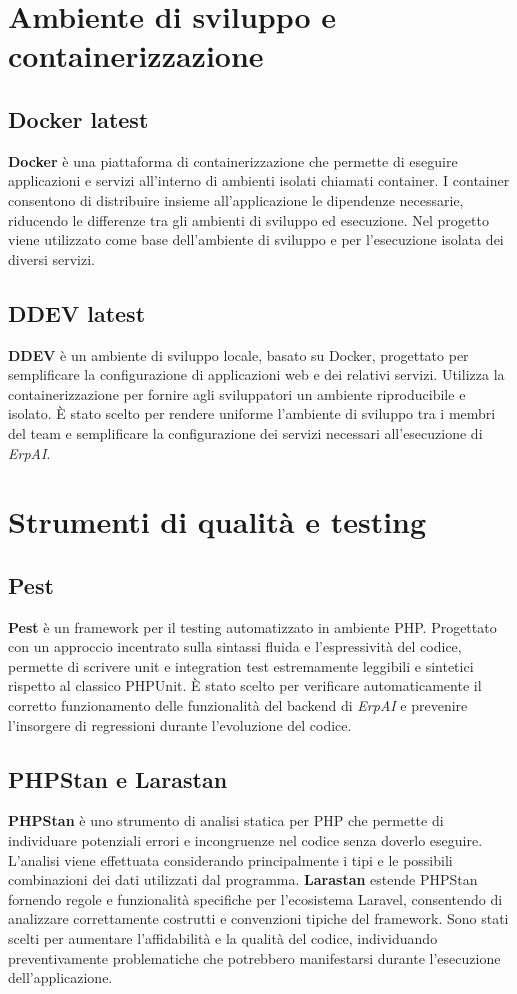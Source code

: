 \section{Ambiente di sviluppo e containerizzazione}

\subsection{Docker latest}
\textbf{Docker} è una piattaforma di containerizzazione che permette di eseguire applicazioni e servizi all'interno di ambienti isolati chiamati container. I container consentono 
di distribuire insieme all'applicazione le dipendenze necessarie, riducendo le differenze tra gli ambienti di sviluppo ed esecuzione. Nel progetto viene utilizzato come base 
dell'ambiente di sviluppo e per l'esecuzione isolata dei diversi servizi.

\subsection{DDEV latest}
\textbf{DDEV} è un ambiente di sviluppo locale, basato su Docker, progettato per semplificare la configurazione di applicazioni web e dei relativi servizi. Utilizza la 
containerizzazione per fornire agli sviluppatori un ambiente riproducibile e isolato. È stato scelto per rendere uniforme l'ambiente di sviluppo tra i membri del team e 
semplificare la configurazione dei servizi necessari all'esecuzione di \textit{ErpAI}.

\section{Strumenti di qualità e testing}
\subsection{Pest}
\textbf{Pest} è un framework per il testing automatizzato in ambiente PHP. Progettato con un approccio incentrato sulla sintassi fluida e l'espressività del codice, 
permette di scrivere unit e integration test estremamente leggibili e sintetici rispetto al classico PHPUnit. È stato scelto per verificare automaticamente il corretto 
funzionamento delle funzionalità del backend di \textit{ErpAI} e prevenire l'insorgere di regressioni durante l'evoluzione del codice.

\subsection{PHPStan e Larastan}
\textbf{PHPStan} è uno strumento di analisi statica per PHP che permette di individuare potenziali errori e incongruenze nel codice senza doverlo eseguire. L'analisi viene 
effettuata considerando principalmente i tipi e le possibili combinazioni dei dati utilizzati dal programma. \textbf{Larastan} estende PHPStan fornendo regole e funzionalità 
specifiche per l'ecosistema Laravel, consentendo di analizzare correttamente costrutti e convenzioni tipiche del framework. Sono stati scelti per aumentare l'affidabilità e 
la qualità del codice, individuando preventivamente problematiche che potrebbero manifestarsi durante l'esecuzione dell'applicazione.

